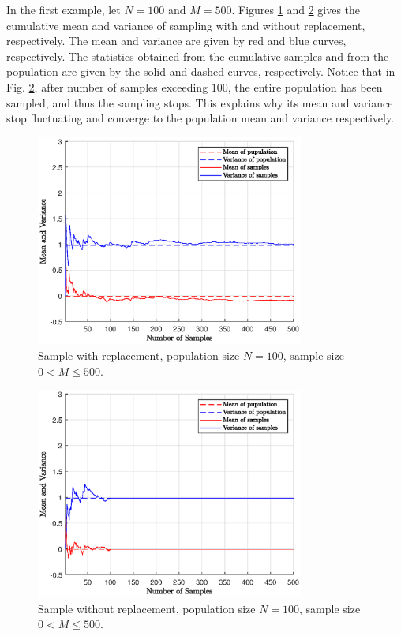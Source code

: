 In the first example, let $N=100$ and $M=500$. Figures \ref{ch:sampling:fig:sample-wr-n100} and \ref{ch:sampling:fig:sample-nwr-n100} gives the cumulative mean and variance of sampling with and without replacement, respectively. The mean and variance are given by red and blue curves, respectively. The statistics obtained from the cumulative samples and from the population are given by the solid and dashed curves, respectively. Notice that in Fig. \ref{ch:sampling:fig:sample-nwr-n100}, after number of samples exceeding $100$, the entire population has been sampled, and thus the sampling stops. This explains why its mean and variance stop fluctuating and converge to the population mean and variance respectively.

\begin{figure}
	\centering
	\includegraphics[width=250pt]{chapters/ch-sampling/figures/sample-wr-n100.eps}
	\caption{Sample with replacement, population size $N=100$, sample size $0< M\leq500$.} \label{ch:sampling:fig:sample-wr-n100}
\end{figure}

\begin{figure}
	\centering
	\includegraphics[width=250pt]{chapters/ch-sampling/figures/sample-nwr-n100.eps}
	\caption{Sample without replacement, population size $N=100$, sample size $0< M\leq500$.} \label{ch:sampling:fig:sample-nwr-n100}
\end{figure}

